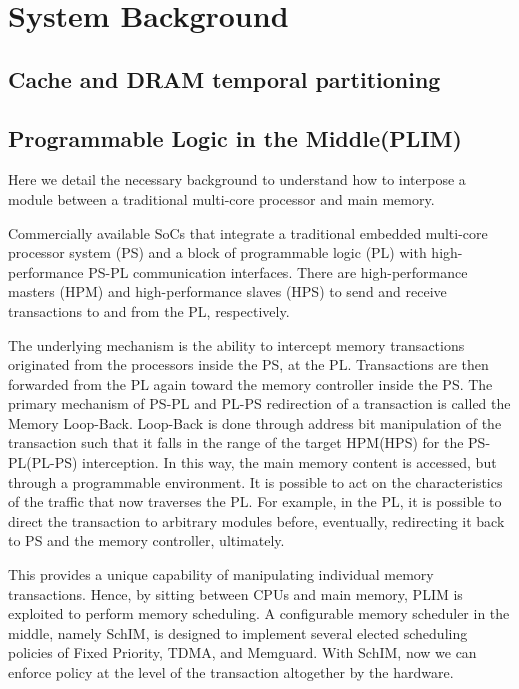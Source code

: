 \section{System Background}
\subsection{Cache and DRAM temporal partitioning}

\subsection{Programmable Logic in the Middle(PLIM)}
    Here we detail the necessary background to understand how to interpose a module between a traditional multi-core processor and main memory.

    Commercially available SoCs that integrate a traditional embedded multi-core processor system (PS) and a block of programmable logic (PL) with high-performance PS-PL communication interfaces. There are high-performance masters (HPM) and high-performance slaves (HPS) to send and receive transactions to and from the PL, respectively.

    The underlying mechanism is the ability to intercept memory transactions originated from the processors inside the PS, at the PL. Transactions are then forwarded from the PL again toward the memory controller inside the PS. The primary mechanism of PS-PL and PL-PS redirection of a transaction is called the Memory Loop-Back. Loop-Back is done through address bit manipulation of the transaction such that it falls in the range of the target HPM(HPS) for the PS-PL(PL-PS) interception. In this way, the main memory content is accessed, but through a programmable environment. It is possible to act on the characteristics of the traffic that now traverses the PL. For example, in the PL, it is possible to direct the transaction to arbitrary modules before, eventually, redirecting it back to PS and the memory controller, ultimately.

    This provides a unique capability of manipulating individual memory transactions. Hence, by sitting between CPUs and main memory, PLIM is exploited to perform memory scheduling. A configurable memory scheduler in the middle, namely SchIM, is designed to implement several elected scheduling policies of Fixed Priority, TDMA, and Memguard. With
    SchIM, now we can enforce policy at the level of the transaction altogether by the hardware.



